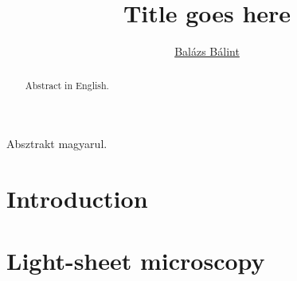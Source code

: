 \documentclass{diploma_style}
\author{\href{mailto:balint.balazs@embl.de}{Balázs Bálint}}
\title{Title goes here}
\begin{document}
\maketitle
{}





\begin{absztrakt}
Absztrakt magyarul.
\end{absztrakt}

\begin{abstract}
Abstract in English.
\end{abstract}



\tableofcontents
\setcounter{page}{1}

\chapter{Introduction}
\cite{huisken_optical_2004}


\chapter{Light-sheet microscopy}
\end{document}

